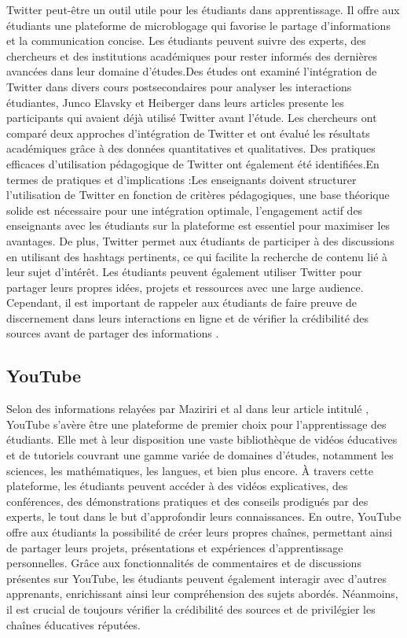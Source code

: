 \documentclass[12pt,a4paper,titlepage]{article}
\begin{document}
Twitter peut-être un outil utile pour les étudiants dans apprentissage. Il offre aux étudiants une plateforme de microblogage qui favorise le partage d'informations et la communication concise. Les étudiants peuvent suivre des experts, des chercheurs et des institutions académiques pour rester informés des dernières avancées dans leur domaine d'études.Des études ont examiné l'intégration de Twitter dans divers cours postsecondaires pour analyser les interactions étudiantes, Junco Elavsky et Heiberger \citep{junco2013putting} dans leurs articles presente les participants qui avaient déjà utilisé Twitter avant l'étude. Les chercheurs ont comparé deux approches d'intégration de Twitter et ont évalué les résultats académiques grâce à des données quantitatives et qualitatives. Des pratiques efficaces d'utilisation pédagogique de Twitter ont également été identifiées.En termes de pratiques et d'implications :Les enseignants doivent structurer l'utilisation de Twitter en fonction de critères pédagogiques, une base théorique solide est nécessaire pour une intégration optimale,
l'engagement actif des enseignants avec les étudiants sur la plateforme est essentiel pour maximiser les avantages. De plus, Twitter permet aux étudiants de participer à des discussions en utilisant des hashtags pertinents, ce qui facilite la recherche de contenu lié à leur sujet d'intérêt. Les étudiants peuvent également utiliser Twitter pour partager leurs propres idées, projets et ressources avec une large audience. Cependant, il est important de rappeler aux étudiants de faire preuve de discernement dans leurs interactions en ligne et de vérifier la crédibilité des sources avant de partager des informations .


\subsection{YouTube}
Selon des informations relayées par Maziriri et al  dans leur article intitulé \citep{maziriri2020student}, YouTube s'avère être une plateforme de premier choix pour l'apprentissage des étudiants. Elle met à leur disposition une vaste bibliothèque de vidéos éducatives et de tutoriels couvrant une gamme variée de domaines d'études, notamment les sciences, les mathématiques, les langues, et bien plus encore. À travers cette plateforme, les étudiants peuvent accéder à des vidéos explicatives, des conférences, des démonstrations pratiques et des conseils prodigués par des experts, le tout dans le but d'approfondir leurs connaissances. En outre, YouTube offre aux étudiants la possibilité de créer leurs propres chaînes, permettant ainsi de partager leurs projets, présentations et expériences d'apprentissage personnelles. Grâce aux fonctionnalités de commentaires et de discussions présentes sur YouTube, les étudiants peuvent également interagir avec d'autres apprenants, enrichissant ainsi leur compréhension des sujets abordés. Néanmoins, il est crucial de toujours vérifier la crédibilité des sources et de privilégier les chaînes éducatives réputées.
\end{document}
